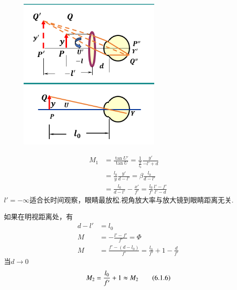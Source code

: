         \begin{figure}[H]
            \centering
            \includegraphics[width=7cm]{img/6.1.png}
            \end{figure}
\begin{equation}
\begin{aligned}
M_1&=\frac{\tan U'}{\tan U}=\frac{1}{\frac{y}{l_0}} \frac{y'}{-l'+d} \\
&=\frac{l_0}{y}\frac{y'}{d-l'}=\beta \frac{l_0}{d-l'}\\
&= \frac{l_0}{d-l'} -\frac{x'}{f'}=\frac{l_0}{f'} \frac{l'-f'}{l'-d} 
\end{aligned} \tag{6.1.4}
\end{equation}
$l'=-\infty$适合长时间观察，眼睛最放松.视角放大率与放大镜到眼睛距离无关.

如果在明视距离处，有
\begin{align}
   d-l'&=l_0 \tag{6.1.5.a}\\
   M&=-\frac{l'-f'}{f'}=\Phi  \tag{6.1.5.b} \\
   M&=\frac{f'-(d-l_0)}{f'}=\frac{l_0}{f'}+1-\frac{d}{f'} \tag{6.1.5.c}
\end{align}
当$d\to 0$ 
\begin{equation}
M_2=\frac{l_0}{f'}+1 \thickapprox M_2 \tag{6.1.6}
\end{equation}

